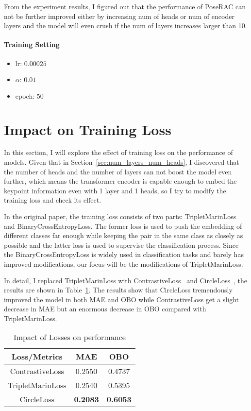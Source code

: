 \documentclass[10pt,twocolumn,letterpaper]{article}
\begin{document}
    From the experiment results, I figured out that the performance of PoseRAC can not be further improved either by increasing num of heads or num of encoder layers and 
    the model will even crush if the num of layers increases larger than 10.

    \paragraph{Training Setting}
    \begin{itemize}
        \item lr: $0.00025$
        \item $\alpha$: $0.01$
        \item epoch: $50$
    \end{itemize}

    \section{Impact on Training Loss}
    In this section, I will explore the effect of training loss on the performance of models.
    Given that in Section~\ref{sec:num_layers_num_heads}, I discovered that the number of heads and the number of layers can not boost the model even further, which means
    the transformer encoder is capable enough to embed the keypoint information even with 1 layer and 1 heads, so I try to modify the training loss and check its effect.

    In the original paper, the training loss consists of two parts: TripletMarinLoss and BinaryCrossEntropyLoss. The former loss is used to push the embedding of different classes far enough while 
    keeping the pair in the same class as closely as possible and the latter loss is used to supervise the classification process.
    Since the BinaryCrossEntropyLoss is widely used in classification tasks and barely has improved modifications, our focus will be the modifications of TripletMarinLoss.

    In detail, I replaced TripletMarinLoss with ContrastiveLoss~\cite{hadsell2006dimensionality} and CircleLoss~\cite{sun2020circle}, the results are shown in Table~\ref{tab:Loss}.
    The results show that CircleLoss tremendously improved the model in both MAE and OBO while ContrastiveLoss get a slight decrease in MAE but an enormous decrease in OBO compared with TripletMarinLoss.


    \begin{table}
        \centering
        \begin{tabular}[pos]{c c c}
            \hline
            Loss/Metrics & MAE & OBO\\
            \hline
            ContrastiveLoss & 0.2550 & 0.4737\\
            TripletMarinLoss & 0.2540 & 0.5395\\
            CircleLoss & {\bf 0.2083} & {\bf 0.6053}\\
            \hline
        \end{tabular}
        \caption{Impact of Losses on performance}
        \label{tab:Loss}
    \end{table}
\end{document}
